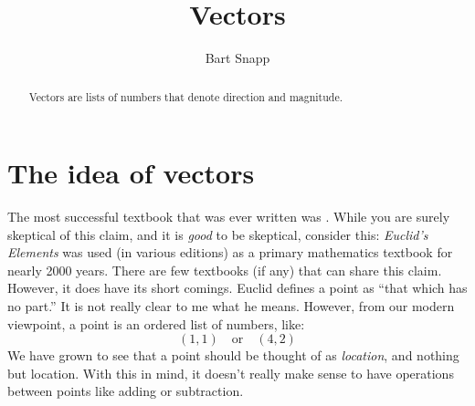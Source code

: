 \documentclass{ximera}
\author{Bart Snapp}
\title[Dig-In:]{Vectors}
\begin{document}
\begin{abstract}
  Vectors are lists of numbers that denote direction and magnitude.
\end{abstract}
\maketitle


\section{The idea of vectors}

The most successful textbook that was ever written was . While
you are surely skeptical of this claim, and it is \textit{good} to be
skeptical, consider this: \textit{Euclid's Elements} was used (in
various editions) as a primary mathematics textbook for nearly 2000
years. There are few textbooks (if any) that can share this
claim. However, it does have its short comings. Euclid defines a point
as ``that which has no part.'' It is not really clear to me what he
means. However, from our modern viewpoint, a point is an ordered list
of numbers, like:
\[
(1,1)\quad\text{or}\quad(4,2)
\]
We have grown to see that a point should be thought of as
\textit{location}, and nothing but location. With this in mind, it
doesn't really make sense to have operations between points like
adding or subtraction.
\end{document}
